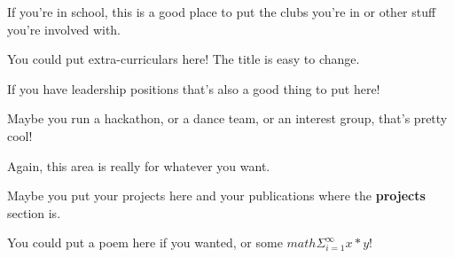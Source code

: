
\begin{tightemize}
\item If you're in school, this is a good place to put the clubs you're in or other stuff you're involved with.
\item You could put extra-curriculars here! The title is easy to change.
\end{tightemize}
\subsectionsep

\begin{tightemize}
\item If you have leadership positions that's also a good thing to put here!
\item Maybe you run a hackathon, or a dance team, or an interest group, that's pretty cool!
\end{tightemize}

\begin{tightemize}
\item Again, this area is really for whatever you want.
\item Maybe you put your projects here and your publications where the \textbf{projects} section is.
\item You could put a poem here if you wanted, or some $math \Sigma_{i=1}^{\infty}x*y!$
\end{tightemize}
